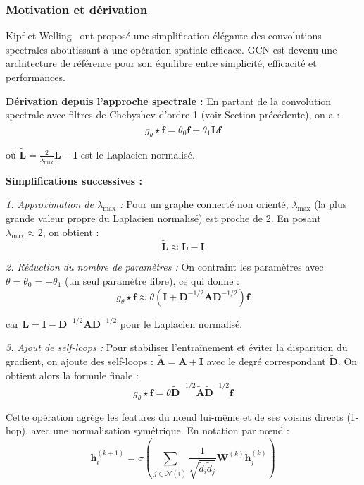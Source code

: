 \subsubsection{Motivation et dérivation}

Kipf et Welling~\cite{Kipf2017} ont proposé une simplification élégante des convolutions spectrales aboutissant à une opération spatiale efficace. GCN est devenu une architecture de référence pour son équilibre entre simplicité, efficacité et performances.

\textbf{Dérivation depuis l'approche spectrale :}
En partant de la convolution spectrale avec filtres de Chebyshev d'ordre 1 (voir Section précédente), on a :
\[
g_\theta \star \mathbf{f} = \theta_0 \mathbf{f} + \theta_1 \tilde{\mathbf{L}} \mathbf{f}
\]

où $\tilde{\mathbf{L}} = \frac{2}{\lambda_{\max}}\mathbf{L} - \mathbf{I}$ est le Laplacien normalisé.

\textbf{Simplifications successives :}

\textit{1. Approximation de $\lambda_{\max}$ :}
Pour un graphe connecté non orienté, $\lambda_{\max}$ (la plus grande valeur propre du Laplacien normalisé) est proche de 2. En posant $\lambda_{\max} \approx 2$, on obtient :
\[
\tilde{\mathbf{L}} \approx \mathbf{L} - \mathbf{I}
\]

\textit{2. Réduction du nombre de paramètres :}
On contraint les paramètres avec $\theta = \theta_0 = -\theta_1$ (un seul paramètre libre), ce qui donne :
\[
g_\theta \star \mathbf{f} \approx \theta(\mathbf{I} + \mathbf{D}^{-1/2}\mathbf{A}\mathbf{D}^{-1/2}) \mathbf{f}
\]

car $\mathbf{L} = \mathbf{I} - \mathbf{D}^{-1/2}\mathbf{A}\mathbf{D}^{-1/2}$ pour le Laplacien normalisé.

\textit{3. Ajout de self-loops :}
Pour stabiliser l'entraînement et éviter la disparition du gradient, on ajoute des self-loops : $\tilde{\mathbf{A}} = \mathbf{A} + \mathbf{I}$ avec le degré correspondant $\tilde{\mathbf{D}}$. On obtient alors la formule finale :
\[
g_\theta \star \mathbf{f} = \theta \tilde{\mathbf{D}}^{-1/2}\tilde{\mathbf{A}}\tilde{\mathbf{D}}^{-1/2} \mathbf{f}
\]

Cette opération agrège les features du nœud lui-même et de ses voisins directs (1-hop), avec une normalisation symétrique. En notation par nœud :
\[
\mathbf{h}_i^{(k+1)} = \sigma\left(\sum_{j \in \tilde{\mathcal{N}}(i)} \frac{1}{\sqrt{\tilde{d}_i \tilde{d}_j}} \mathbf{W}^{(k)}\mathbf{h}_j^{(k)}\right)
\]

